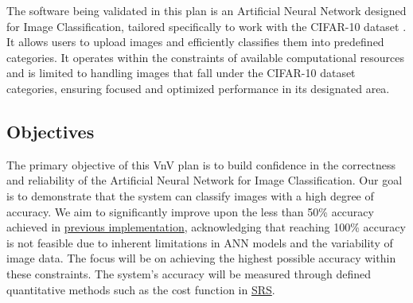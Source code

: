 \documentclass[12pt, titlepage]{article}
\begin{document}
The software being validated in this plan is an Artificial Neural Network designed for 
Image Classification, tailored specifically to work with the CIFAR-10 dataset \cite{CIFAR10}. 
It allows users to upload images and efficiently classifies them into predefined 
categories. It operates within the constraints of available computational 
resources and is limited to handling images that fall under the CIFAR-10 dataset \cite{CIFAR10}
categories, ensuring focused and optimized performance in its designated area.

\subsection{Objectives}

The primary objective of this VnV plan is to build confidence in the correctness and 
reliability of the Artificial Neural Network for Image Classification. Our goal is to 
demonstrate that the system can classify images with a high degree of accuracy. We aim 
to significantly improve upon the less than 50\% accuracy achieved in 
\href{https://github.com/tanya-jp/CIFAR-Classification/blob/main/CIFAR_ANN.ipynb}{previous implementation}, 
acknowledging that reaching 100\% accuracy is not feasible due to inherent limitations in 
ANN models and the variability of image data. The focus will be on achieving the highest 
possible accuracy within these constraints. The system's accuracy will be measured through 
defined quantitative methods such as the cost function in \href{https://github.com/tanya-jp/ANN-CAS741/blob/main/docs/SRS/SRS.pdf}{SRS}.



\end{document}
